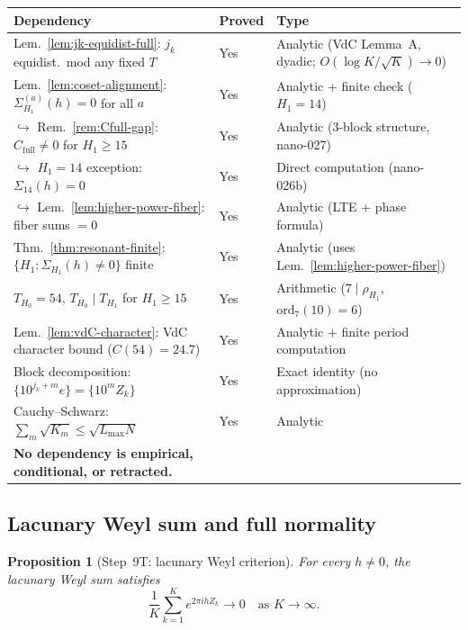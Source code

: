 \documentclass[
]{article}
\newtheorem{proposition}[theorem]{Proposition}
\begin{document}
\begin{center}
\begin{tabular}{lll}
\toprule
Dependency & Proved & Type \\
\midrule
Lem.~\ref{lem:jk-equidist-full}: $j_k$ equidist.\ mod any fixed $T$
  & Yes & Analytic (VdC Lemma~A, dyadic; $O(\log K/\sqrt{K})\to 0$) \\
Lem.~\ref{lem:coset-alignment}: $\Sigma_{H_1}^{(a)}(h)=0$ for all $a$
  & Yes & Analytic + finite check ($H_1=14$) \\
\quad $\hookrightarrow$ Rem.~\ref{rem:Cfull-gap}: $C_{\mathrm{full}}\ne 0$ for $H_1\ge 15$
  & Yes & Analytic (3-block structure, nano-027) \\
\quad $\hookrightarrow$ $H_1=14$ exception: $\Sigma_{14}(h)=0$
  & Yes & Direct computation (nano-026b) \\
\quad $\hookrightarrow$ Lem.~\ref{lem:higher-power-fiber}: fiber sums $= 0$
  & Yes & Analytic (LTE + phase formula) \\
Thm.~\ref{thm:resonant-finite}: $\{H_1:\Sigma_{H_1}(h)\ne 0\}$ finite
  & Yes & Analytic (uses Lem.~\ref{lem:higher-power-fiber}) \\
$T_{H_0}=54$, $T_{H_0}\mid T_{H_1}$ for $H_1\ge 15$
  & Yes & Arithmetic ($7\mid\rho_{H_1}$, $\mathrm{ord}_7(10)=6$) \\
Lem.~\ref{lem:vdC-character}: VdC character bound ($C(54)=24.7$)
  & Yes & Analytic + finite period computation \\
Block decomposition: $\{10^{j_k+m}e\}=\{10^mZ_k\}$
  & Yes & Exact identity (no approximation) \\
Cauchy--Schwarz: $\sum_m\sqrt{K_m}\le\sqrt{L_{\max}N}$
  & Yes & Analytic \\
\midrule
\textbf{No dependency is empirical, conditional, or retracted.} & & \\
\bottomrule
\end{tabular}
\end{center}

\subsection{Lacunary Weyl sum and full normality}
\label{sec:aci-main-sketch}

\begin{proposition}[Step~9T: lacunary Weyl criterion]\label{prop:aci-conditional}
For every $h\ne 0$, the lacunary Weyl sum satisfies
\[
  \frac{1}{K}\sum_{k=1}^K e^{2\pi i h Z_k}\to 0
  \quad\text{as }K\to\infty.
\]
\end{proposition}
\end{document}
